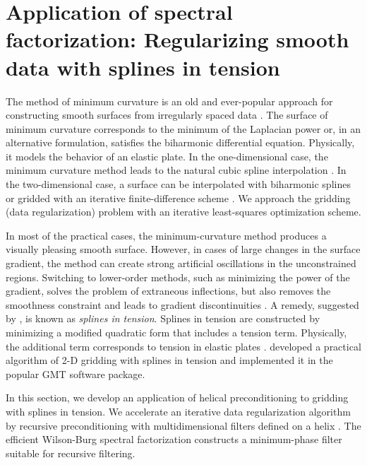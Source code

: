 \section{Application of spectral factorization: \newline
  Regularizing smooth data with splines in tension}


The method of minimum curvature is an old and ever-popular approach
for constructing smooth surfaces from irregularly spaced data
\cite[]{GEO39-01-00390048}. The surface of minimum curvature corresponds
to the minimum of the Laplacian power or, in an alternative
formulation, satisfies the biharmonic differential equation.
Physically, it models the behavior of an elastic plate. In the
one-dimensional case, the minimum curvature method leads to the
natural cubic spline interpolation \cite[]{deBoor}. In the
two-dimensional case, a surface can be interpolated with biharmonic
splines \cite[]{sandwell} or gridded with an iterative finite-difference
scheme \cite[]{swain}.  We approach the gridding (data regularization)
problem with an iterative least-squares optimization scheme.
\par
In most of the practical cases, the minimum-curvature method produces
a visually pleasing smooth surface. However, in cases of large changes
in the surface gradient, the method can create strong artificial
oscillations in the unconstrained regions. Switching to lower-order
methods, such as minimizing the power of the gradient, solves the
problem of extraneous inflections, but also removes the smoothness
constraint and leads to gradient discontinuities
\cite[]{galilee}. A remedy, suggested by \cite{schweikert},
is known as \emph{splines in tension}. Splines in tension are
constructed by minimizing a modified quadratic form that includes a
tension term. Physically, the additional term corresponds to tension
in elastic plates \cite[]{timoshenko}. \cite{GEO55-03-02930305}
developed a practical algorithm of 2-D gridding with splines in
tension and implemented it in the popular GMT software
package.
\par
In this section, we develop an application of helical preconditioning
to gridding with splines in tension. We accelerate an iterative data
regularization algorithm by recursive preconditioning with
multidimensional filters defined on a helix \cite[]{GEO68-02-05770588}. The
efficient Wilson-Burg spectral factorization constructs a
minimum-phase filter suitable for recursive filtering.

